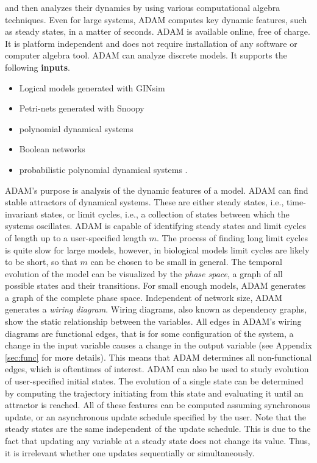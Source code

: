 \documentclass[11pt]{amsart}
\begin{document}
and then analyzes their dynamics by using various computational algebra techniques. Even for large systems, ADAM
computes key dynamic features, such as steady states, in a matter of seconds.
ADAM is available online, free of charge. It is platform
independent and does not require installation of any software or computer
algebra tool.
ADAM can analyze discrete models. It supports the following {\bf inputs}.
\begin{itemize}
\item Logical models generated with GINsim \cite{GINsim}
\item Petri-nets generated with Snoopy \cite{Snoopy}
\item polynomial dynamical systems
\item Boolean networks
\item probabilistic polynomial dynamical systems \cite{shmulevich}.
\end{itemize}
ADAM’s purpose is analysis of the dynamic features of a model. ADAM can find stable attractors of dynamical systems. These are either steady states, i.e., time-invariant states,
or limit cycles, i.e., a collection of states between which the systems oscillates. ADAM is capable of identifying steady states and limit cycles of length up to a user-specified length $m$. The process of finding long limit cycles is quite slow for large models, however, in biological models limit cycles are likely to be short, so that $m$ can be chosen to be small in general.
The temporal evolution of the model can be visualized by the {\it phase space}, a graph of all possible states and their transitions. For small enough models, ADAM generates a graph of the complete phase space. Independent of network size, ADAM generates a {\it wiring diagram}. Wiring diagrams, also known as dependency graphs, show the static relationship between the variables. All edges in ADAM’s wiring diagrams are functional edges, that is for some configuration of the system, a change in the input variable causes a change in the output variable (see Appendix \ref{sec:func} for more details). This means that ADAM determines all non-functional edges, which is oftentimes of interest.
ADAM can also be used to study evolution of user-specified initial states. The evolution of a single state can be determined by computing the trajectory initiating from this state and evaluating it until an attractor is reached.
All of these features can be computed assuming synchronous update, or an asynchronous update schedule specified by the user. Note that the steady states are the same independent of the update schedule. This is due to the fact that updating any variable at a steady state does not change its value. Thus, it is irrelevant whether one updates sequentially or simultaneously.  
 
\end{document}
